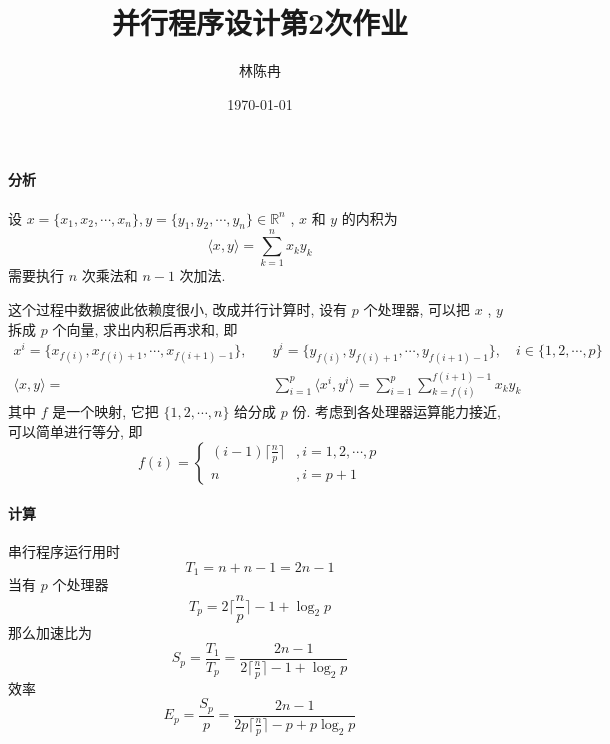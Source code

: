 \documentclass[a4paper, UTF8]{ctexart}				%
\title{并行程序设计第2次作业}
\author{林陈冉}
\date{\today}
\numberwithin{equation}{section}				%
\begin{document}
    \maketitle										%
    \paragraph{分析}
        设 $x = \{x_1, x_2, \cdots, x_n\}, y = \{y_1, y_2, \cdots, y_n\} \in \mathbb{R}^n$ , $x$ 和 $y$ 的内积为 
        \[
            \langle{x},{y}\rangle  = \sum^{n}_{k = 1} x_k y_k
        \]
        需要执行 $n$ 次乘法和 $n - 1$ 次加法.
        
        这个过程中数据彼此依赖度很小, 改成并行计算时, 设有 $p$ 个处理器, 可以把 $x$ , $y$ 拆成 $p$ 个向量, 求出内积后再求和, 即 
        \begin{equation*}
            \begin{split}
                x^i = \{x_{f(i)}, x_{f(i) + 1}, \cdots, x_{f(i+1)-1}\}, \quad 
                &y^i = \{y_{f(i)}, y_{f(i) + 1}, \cdots, y_{f(i+1)-1}\}, \quad
                i \in \{1, 2, \cdots, p\}\\
                \langle{x},{y}\rangle = &
                \sum^{p}_{i=1} \langle{x^i},{y^i}\rangle = 
                \sum^{p}_{i=1} \sum^{f(i+1)-1}_{k=f(i)} x_k y_k
            \end{split}
        \end{equation*}
        其中 $f$ 是一个映射, 它把 $\{1, 2, \cdots, n\}$ 给分成 $p$ 份. 考虑到各处理器运算能力接近, 可以简单进行等分, 即
        $$
            f(i) = \begin{cases}
                (i - 1) \lceil \frac{n}{p} \rceil &, i=1, 2, \cdots, p\\
                n &, i = p + 1
            \end{cases} 
        $$

    \paragraph{计算}
        串行程序运行用时 
        \[
            T_1 = n + n-1 = 2n - 1
        \]
        当有 $p$ 个处理器 
        \[
            T_p = 2 \lceil \frac{n}{p} \rceil - 1 + \log_2 p
        \]
        那么加速比为 
        \[
            S_p = \frac{T_1}{T_p} = \frac{2n - 1}{2 \lceil \frac{n}{p} \rceil - 1 + \log_2 p}
        \]
        效率 
        \[
            E_p = \frac{S_p}{p} = \frac{2n - 1}{2p \lceil \frac{n}{p} \rceil - p + p\log_2 p}
        \]
\end{document}
